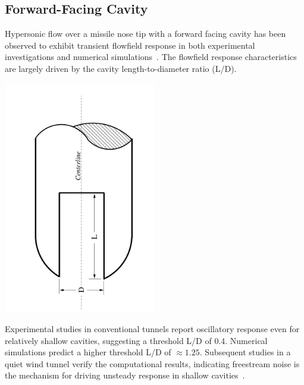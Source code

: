 \documentclass[compress,11pt]{beamer}
\begin{document}

\subsection{Forward-Facing Cavity}
\frame
{
  \scriptsize
  Hypersonic flow over a missile nose tip with a forward facing cavity has been observed to exhibit transient flowfield response in both experimental investigations and numerical simulations~\cite{engblom_goldstein_AIAA-1996-354,silton_goldstein_JTHPHT}. The flowfield response characteristics are largely driven by the cavity length-to-diameter ratio (L/D).  
  \begin{center}
    \includegraphics[angle=270,width=0.5\textwidth]{figures/sphere_cavity/LD_2.0/schematic}
  \end{center}
  
  Experimental studies in conventional tunnels report oscillatory response even for relatively shallow cavities, suggesting a threshold L/D of 0.4. Numerical simulations predict a higher threshold L/D of $\approx 1.25$.  Subsequent studies in a quiet wind tunnel verify the computational results, indicating freestream noise is the mechanism for driving unsteady response in shallow cavities~\cite{engblom_goldstein_AIAA-1996-667}.
}
\end{document}
